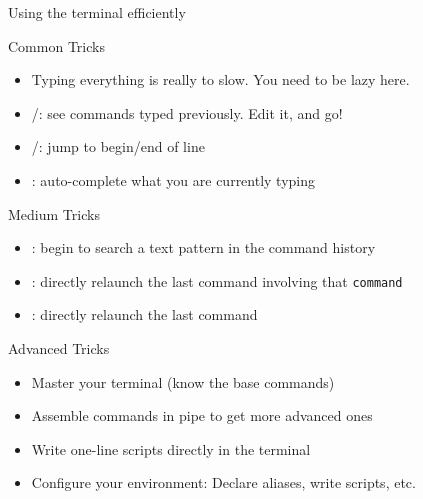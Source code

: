 \begin{frame}[squeeze]{Using the terminal efficiently}
  \begin{block}{Common Tricks}
    \begin{itemize}
    \item Typing everything is really to slow. You need to be lazy here.
    \item {}/: see commands typed previously. Edit it, and
      go!
    \item {}/: jump to begin/end of line
    \item {}: auto-complete what you are currently typing
    \end{itemize}
  \end{block}\vspace{-.5\baselineskip}

  \begin{block}{Medium Tricks}
    \begin{itemize}
    \item {}: begin to search a text pattern in the command
      history
    \item {}: directly relaunch the last command
      involving that \texttt{command}
    \item \fbox{\texttt{!!}}: directly relaunch the last command
    \end{itemize}
  \end{block}\vspace{-.5\baselineskip}

  \begin{block}{Advanced Tricks}
    \begin{itemize}
    \item Master your terminal (know the base commands)
    \item Assemble commands in pipe to get more advanced ones
    \item Write one-line scripts directly in the terminal
    \item Configure your environment: Declare aliases, write scripts, etc.
    \end{itemize}
  \end{block}
\end{frame}
